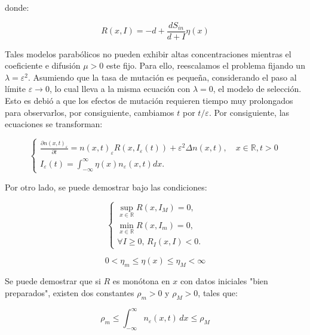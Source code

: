 donde:

\begin{equation*}
	R(x,I)=-d+\frac{dS_{in}}{d+I}\eta(x)
\end{equation*}

\citep{Mirrahimi2011}Tales modelos parabólicos no pueden exhibir altas concentraciones mientras el coeficiente e difusión $\mu>0$ este fijo. Para ello, reescalamos el problema fijando un $\lambda=\varepsilon^2$. Asumiendo que la tasa de mutación es pequeña, considerando el paso al límite $\varepsilon \rightarrow 0$, lo cual lleva a la misma ecuación con $\lambda=0$, el modelo de selección. Esto es debió a que los efectos de mutación requieren tiempo muy prolongados para observarlos, por consiguiente, cambiamos $t$ por $t/\varepsilon$. Por consiguiente, las ecuaciones se transforman:

\begin{equation}
	\left\{\begin{array}{l}
		\frac{\partial n(x, t)_\varepsilon}{\partial t}=n(x, t)_\varepsilon R(x, I_\varepsilon(t))+ \varepsilon^2 \Delta n(x, t), \quad x \in \mathbb{R}, t>0 \\
		I_\varepsilon(t)=\int_{-\infty}^{\infty} \eta(x) n_\varepsilon(x, t) d x .
	\end{array}\right.
\end{equation}

Por otro lado, se puede demostrar bajo las condiciones:

\begin{equation*}
	\begin{cases}
		\sup_{x \in \mathbb{R}} R(x, I_M) = 0, \\
		\min_{x \in \mathbb{R}} R(x, I_m) = 0, \\
		\forall I \geq 0, \, R_I(x, I) < 0.
	\end{cases}
\end{equation*}

\begin{equation*}
	0< \eta_m \leq \eta(x) \leq \eta_M < \infty
\end{equation*}

Se puede demostrar que si $R$ es monótona en $x$ con datos iniciales "bien preparados", existen dos constantes $\rho_m >0$ y $\rho_M >0$, tales que:

\begin{equation*}
	\rho_m \leq \int_{-\infty}^{\infty} n_\varepsilon(x,t) \, dx \leq \rho_M
\end{equation*}

